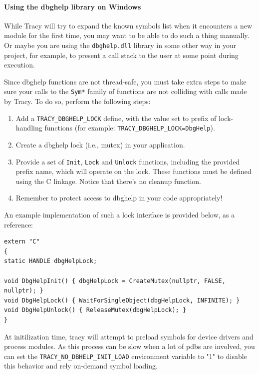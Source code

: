 \documentclass[hidelinks,titlepage,a4paper]{article}
\begin{document}
\paragraph{Using the dbghelp library on Windows}

While Tracy will try to expand the known symbols list when it encounters a new module for the first time, you may want to be able to do such a thing manually. Or maybe you are using the \texttt{dbghelp.dll} library in some other way in your project, for example, to present a call stack to the user at some point during execution.

Since dbghelp functions are not thread-safe, you must take extra steps to make sure your calls to the \texttt{Sym*} family of functions are not colliding with calls made by Tracy. To do so, perform the following steps:

\begin{enumerate}
\item Add a \texttt{TRACY\_DBGHELP\_LOCK} define, with the value set to prefix of lock-handling functions (for example: \texttt{TRACY\_DBGHELP\_LOCK=DbgHelp}).
\item Create a dbghelp lock (i.e., mutex) in your application.
\item Provide a set of \texttt{Init}, \texttt{Lock} and \texttt{Unlock} functions, including the provided prefix name, which will operate on the lock. These functions must be defined using the C linkage. Notice that there's no cleanup function.
\item Remember to protect access to dbghelp in your code appropriately!
\end{enumerate}

An example implementation of such a lock interface is provided below, as a reference:

\begin{lstlisting}
extern "C"
{
static HANDLE dbgHelpLock;

void DbgHelpInit() { dbgHelpLock = CreateMutex(nullptr, FALSE, nullptr); }
void DbgHelpLock() { WaitForSingleObject(dbgHelpLock, INFINITE); }
void DbgHelpUnlock() { ReleaseMutex(dbgHelpLock); }
}
\end{lstlisting}

At initilization time, tracy will attempt to preload symbols for device drivers and process modules. As this process can be slow when a lot of pdbs are involved, you can set the \texttt{TRACY\_NO\_DBHELP\_INIT\_LOAD} environment variable to "1" to disable this behavior and rely on-demand symbol loading.
\end{document}
